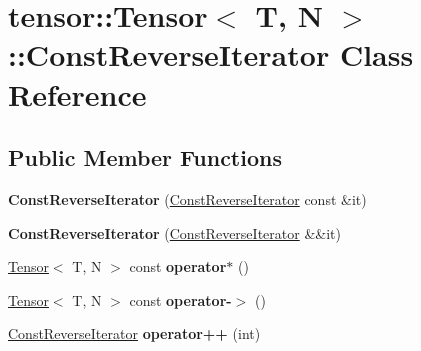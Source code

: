 \hypertarget{classtensor_1_1Tensor_1_1ConstReverseIterator}{}\section{tensor\+:\+:Tensor$<$ T, N $>$\+:\+:Const\+Reverse\+Iterator Class Reference}
\label{classtensor_1_1Tensor_1_1ConstReverseIterator}
\subsection*{Public Member Functions}
\begin{DoxyCompactItemize}
\item 
{\bfseries Const\+Reverse\+Iterator} (\hyperlink{classtensor_1_1Tensor_1_1ConstReverseIterator}{Const\+Reverse\+Iterator} const \&it)\hypertarget{classtensor_1_1Tensor_1_1ConstReverseIterator_a488c38f763f5ca97f4ccd551015ffae1}{}\label{classtensor_1_1Tensor_1_1ConstReverseIterator_a488c38f763f5ca97f4ccd551015ffae1}

\item 
{\bfseries Const\+Reverse\+Iterator} (\hyperlink{classtensor_1_1Tensor_1_1ConstReverseIterator}{Const\+Reverse\+Iterator} \&\&it)\hypertarget{classtensor_1_1Tensor_1_1ConstReverseIterator_ae72372cd17eb7eb0e8d5269b36ce0f4d}{}\label{classtensor_1_1Tensor_1_1ConstReverseIterator_ae72372cd17eb7eb0e8d5269b36ce0f4d}

\item 
\hyperlink{classtensor_1_1Tensor}{Tensor}$<$ T, N $>$ const {\bfseries operator$\ast$} ()\hypertarget{classtensor_1_1Tensor_1_1ConstReverseIterator_a63d35f54700098ea643aeb0c3fbc5485}{}\label{classtensor_1_1Tensor_1_1ConstReverseIterator_a63d35f54700098ea643aeb0c3fbc5485}

\item 
\hyperlink{classtensor_1_1Tensor}{Tensor}$<$ T, N $>$ const {\bfseries operator-\/$>$} ()\hypertarget{classtensor_1_1Tensor_1_1ConstReverseIterator_a45d4b3a46ad4616c54cc35ee93947f72}{}\label{classtensor_1_1Tensor_1_1ConstReverseIterator_a45d4b3a46ad4616c54cc35ee93947f72}

\item 
\hyperlink{classtensor_1_1Tensor_1_1ConstReverseIterator}{Const\+Reverse\+Iterator} {\bfseries operator++} (int)\hypertarget{classtensor_1_1Tensor_1_1ConstReverseIterator_ace4163494032bbb515ff40474ed5bf35}{}\label{classtensor_1_1Tensor_1_1ConstReverseIterator_ace4163494032bbb515ff40474ed5bf35}


\end{DoxyCompactItemize}

